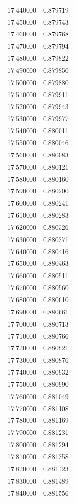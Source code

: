 \begin{tabular}{rr}
17.440000 & 0.879719 \\
17.450000 & 0.879743 \\
17.460000 & 0.879768 \\
17.470000 & 0.879794 \\
17.480000 & 0.879822 \\
17.490000 & 0.879850 \\
17.500000 & 0.879880 \\
17.510000 & 0.879911 \\
17.520000 & 0.879943 \\
17.530000 & 0.879977 \\
17.540000 & 0.880011 \\
17.550000 & 0.880046 \\
17.560000 & 0.880083 \\
17.570000 & 0.880121 \\
17.580000 & 0.880160 \\
17.590000 & 0.880200 \\
17.600000 & 0.880241 \\
17.610000 & 0.880283 \\
17.620000 & 0.880326 \\
17.630000 & 0.880371 \\
17.640000 & 0.880416 \\
17.650000 & 0.880463 \\
17.660000 & 0.880511 \\
17.670000 & 0.880560 \\
17.680000 & 0.880610 \\
17.690000 & 0.880661 \\
17.700000 & 0.880713 \\
17.710000 & 0.880766 \\
17.720000 & 0.880821 \\
17.730000 & 0.880876 \\
17.740000 & 0.880932 \\
17.750000 & 0.880990 \\
17.760000 & 0.881049 \\
17.770000 & 0.881108 \\
17.780000 & 0.881169 \\
17.790000 & 0.881231 \\
17.800000 & 0.881294 \\
17.810000 & 0.881358 \\
17.820000 & 0.881423 \\
17.830000 & 0.881489 \\
17.840000 & 0.881556 \\

\end{tabular}
